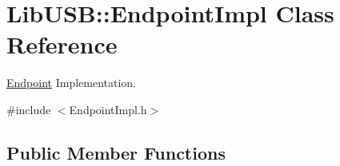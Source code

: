 \hypertarget{class_lib_u_s_b_1_1_endpoint_impl}{\section{Lib\-U\-S\-B\-:\-:Endpoint\-Impl Class Reference}
\label{class_lib_u_s_b_1_1_endpoint_impl}
}


\hyperlink{class_lib_u_s_b_1_1_endpoint}{Endpoint} Implementation.  




{\ttfamily \#include $<$Endpoint\-Impl.\-h$>$}

\subsection*{Public Member Functions}
